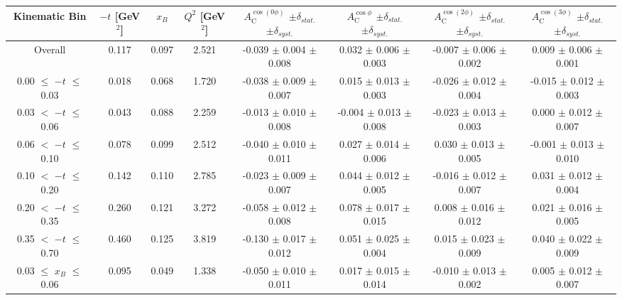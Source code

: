 \begin{table}[width=15cm]
 \begin{center}
\resizebox{16cm}{!} {
  \begin{tabular}{|c|c|c|c|c|c|c|c|}
\hline
Kinematic Bin &  $-t$ [GeV$^{2}$] & $x_{B}$ & $Q^{2}$ [GeV$^{2}$] & 
$A_{\textrm{C}}^{\cos(0\phi)}$ $\pm \delta_{stat.}$ $\pm \delta_{syst.}$ & $A_{\textrm{C}}^{\cos\phi}$ $\pm \delta_{stat.}$ $\pm \delta_{syst.}$
& $A_{\textrm{C}}^{\cos(2\phi)}$ $\pm \delta_{stat.}$ $\pm \delta_{syst.}$ & $A_{\textrm{C}}^{\cos(3\phi)}$ $\pm \delta_{stat.}$ $\pm \delta_{syst.}$ \\
\hline
\hline
Overall &  0.117 & 0.097 &  2.521 &  -0.039 $\pm$  0.004 $\pm$  0.008 & 
0.032  $\pm$  0.006 $\pm$   0.003 &  -0.007  $\pm$  0.006  $\pm$   0.002 &  0.009  $\pm$   0.006   $\pm$   0.001 \\
\hline
0.00 $\leqslant$ $-t$ $\leqslant$ 0.03 &  0.018 & 0.068 &  1.720 &  -0.038  $\pm$  0.009 $\pm$ 0.007 & 
0.015  $\pm$  0.013  $\pm$   0.003 &  -0.026  $\pm$  0.012 $\pm$  0.004 &  -0.015   $\pm$  0.012   $\pm$   0.003\\
0.03 $<$ $-t$ $\leqslant$ 0.06 &  0.043 & 0.088 &  2.259& -0.013  $\pm$  0.010  $\pm$   0.008 &
 -0.004 $\pm$  0.013  $\pm$   0.008 &  -0.023  $\pm$  0.013  $\pm$  0.003 &  0.000   $\pm$  0.012   $\pm$   0.007\\
0.06 $<$ $-t$ $\leqslant$ 0.10 &  0.078 & 0.099 &  2.512 & -0.040  $\pm$  0.010  $\pm$  0.011 & 
0.027 $\pm$  0.014  $\pm$   0.006 & 0.030  $\pm$  0.013 $\pm$   0.005 &  -0.001   $\pm$  0.013  $\pm$    0.010\\
0.10 $<$ $-t$ $\leqslant$ 0.20 &  0.142 & 0.110 &  2.785 &  -0.023  $\pm$  0.009   $\pm$  0.007 & 
0.044 $\pm$  0.012  $\pm$   0.005 &  -0.016  $\pm$  0.012  $\pm$  0.007 & 0.031   $\pm$  0.012    $\pm$  0.004\\
0.20 $<$ $-t$ $\leqslant$ 0.35 &  0.260 & 0.121 &  3.272 &  -0.058 $\pm$   0.012  $\pm$  0.008 &
0.078 $\pm$  0.017  $\pm$ 0.015 & 0.008 $\pm$   0.016  $\pm$  0.012 & 0.021  $\pm$   0.016   $\pm$   0.005\\
0.35 $<$ $-t$ $\leqslant$ 0.70 &  0.460 & 0.125 &  3.819 &  -0.130  $\pm$  0.017  $\pm$   0.012 & 
0.051 $\pm$  0.025  $\pm$   0.004 & 0.015 $\pm$   0.023  $\pm$  0.009 & 0.040   $\pm$  0.022   $\pm$ 0.009\\
\hline
0.03 $\leqslant$ $x_{B}$ $\leqslant$ 0.06 &  0.095 & 0.049 &  1.338 &  -0.050  $\pm$  0.010  $\pm$   0.011 & 
 0.017  $\pm$  0.015  $\pm$   0.014 & -0.010 $\pm$  0.013 $\pm$   0.002 &  0.005   $\pm$  0.012  $\pm$    0.007\\

\end{tabular}}
\end{center}
\end{table}
